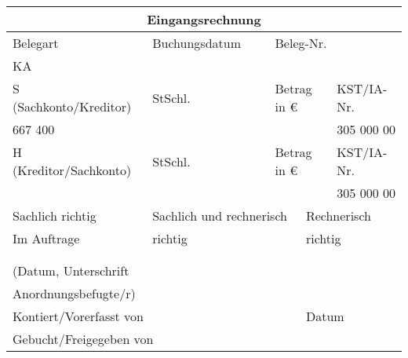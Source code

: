 \documentclass[10pt,a4paper]{scrartcl}
\begin{document}
\begin{minipage}{0.57\textwidth}
	\begin{tabularx}{\textwidth}{|l|l|l|l|l|p{2.562cm}|}
		\hline
			\multicolumn{6}{|c|}{\textbf{Eingangsrechnung}}\\
		\hline
		\footnotesize Belegart&\multicolumn{2}{|l|}{\footnotesize Buchungsdatum}&\multicolumn{3}{|l|}{\footnotesize Beleg-Nr.}\\
		KA&\multicolumn{2}{|l|}{}&\multicolumn{3}{|l|}{}\\
		\hline
		\multicolumn{2}{|l|}{\footnotesize S (Sachkonto/Kreditor)}&\footnotesize StSchl.&\multicolumn{2}{|l|}{\footnotesize Betrag in \euro{}}&\footnotesize KST/IA-Nr.\\
		\multicolumn{2}{|l|}{667 400}&&\multicolumn{2}{|l|}{}&305 000 00\\\hline
		\multicolumn{2}{|l|}{\footnotesize H (Kreditor/Sachkonto)}&\footnotesize StSchl.&\multicolumn{2}{|l|}{\footnotesize Betrag in \euro{}}&\footnotesize KST/IA-Nr.\\
		\multicolumn{2}{|l|}{}& &\multicolumn{2}{|l|}{}&305 000 00\\\hline
	\multicolumn{2}{|l|}{\footnotesize Sachlich richtig}&\multicolumn{2}{|l|}{\footnotesize Sachlich und rechnerisch }&\multicolumn{2}{|l|}{\footnotesize Rechnerisch }\\
	\multicolumn{2}{|l|}{\footnotesize Im Auftrage}&\multicolumn{2}{|l|}{\footnotesize richtig}&\multicolumn{2}{|l|}{richtig}\\
	\multicolumn{2}{|l|}{}&\multicolumn{2}{|l|}{}&\multicolumn{2}{|l|}{}\\
	\multicolumn{2}{|l|}{}&\multicolumn{2}{|l|}{}&\multicolumn{2}{|l|}{}\\
	\multicolumn{2}{|l|}{\footnotesize  (Datum, Unterschrift }&\multicolumn{2}{|l|}{}&\multicolumn{2}{|l|}{}\\
	\multicolumn{2}{|l|}{\footnotesize  Anordnungsbefugte/r)}&\multicolumn{2}{|l|}{}&\multicolumn{2}{|l|}{}\\\hline
	\multicolumn{4}{|l|}{\footnotesize Kontiert/Vorerfasst von  }&\multicolumn{2}{|l|}{\footnotesize Datum}\\
	\multicolumn{4}{|l|}{\footnotesize Gebucht/Freigegeben von   }&\multicolumn{2}{|l|}{}\\\hline
	\end{tabularx}
\end{minipage}
\end{document}
